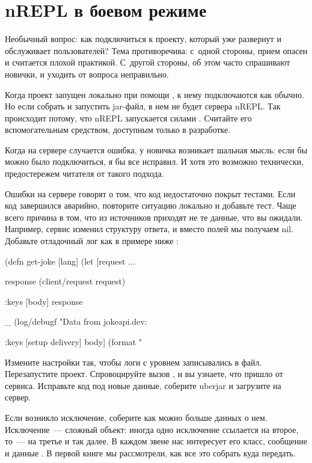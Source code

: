 \section{nREPL в боевом режиме}

Необычный вопрос: как подключиться к проекту, который уже развернут и обслуживает пользователей? Тема противоречива: с~одной стороны, прием опасен и считается плохой практикой. С~другой стороны, об этом часто спрашивают новички, и уходить от вопроса неправильно.

Когда проект запущен локально при помощи , к нему подключаются как обычно. Но если собрать и запустить jar-файл, в нем не будет сервера nREPL. Так происходит потому, что nREPL запускается силами . Считайте его вспомогательным средством, доступным только в разработке.

Когда на сервере случается ошибка, у новичка возникает шальная мысль: если бы можно было подключиться, я бы все исправил. И хотя это возможно технически, предостережем читателя от такого подхода.

Ошибки на сервере говорят о том, что код недостаточно покрыт тестами. Если код завершился аварийно, повторите ситуацию локально и добавьте тест. Чаще всего причина в том, что из источников приходят не те данные, что вы ожидали. Например, сервис  изменил структуру ответа, и вместо полей мы получаем nil. Добавьте отладочный лог как в примере ниже :

\begin{english}
  \begin{clojure/lines}
(defn get-joke [lang]
  (let [request
        {...}

        response
        (client/request request)

        {:keys [body]}
        response

        _ (log/debugf "Data from jokeapi.dev: %

        {:keys [setup delivery]}
        body]
    (format "%
  \end{clojure/lines}
\end{english}

Измените настройки так, чтобы логи с уровнем  записывались в файл. Перезапустите проект. Спровоцируйте вызов , и вы узнаете, что пришло от сервиса. Исправьте код под новые данные, соберите uberjar и загрузите на сервер.

Если возникло исключение, соберите как можно больше данных о нем. Исключение~--- сложный объект: иногда одно исключение ссылается на второе, то~--- на третье и так далее. В каждом звене нас интересует его класс, сообщение и данные . В первой книге мы рассмотрели, как все это собрать куда передать.


